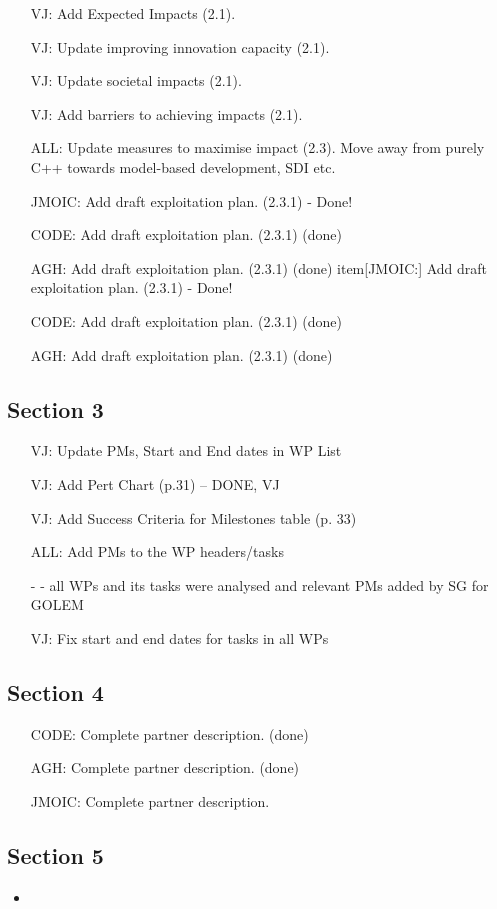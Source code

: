 \begin{itemize}
\item[VJ:]
Add Expected Impacts (2.1).
\item[VJ:]
Update improving innovation capacity (2.1).
\item[VJ:]
Update societal impacts (2.1).
\item[VJ:]
Add barriers to achieving impacts (2.1).
\item[ALL:]
Update measures to maximise impact (2.3).  Move away from purely C++ towards model-based development, SDI etc.
\item[JMOIC:]
Add draft exploitation plan. (2.3.1) - Done! 
\item[CODE:]
Add draft exploitation plan. (2.3.1)   (done)
\item[AGH:]
Add draft exploitation plan. (2.3.1) (done) 
item[JMOIC:]
Add draft exploitation plan. (2.3.1) - Done! 
\item[CODE:]
Add draft exploitation plan. (2.3.1)   (done)
\item[AGH:]
Add draft exploitation plan. (2.3.1) (done) 
\end{itemize}

\subsection*{Section 3}

\begin{itemize}
\item[VJ:]
Update PMs, Start and End dates in WP List
\item[VJ:]
Add Pert Chart (p.31) -- DONE, VJ
\item[VJ:]
Add Success Criteria for Milestones table (p. 33)
\item[ALL:]
Add PMs to the WP headers/tasks
\item[-] - all WPs and its tasks were analysed and relevant PMs added by SG for GOLEM 
\item[VJ:]
Fix start and end dates for tasks in all WPs
\end{itemize}

\subsection*{Section 4}

\begin{itemize}
\item[CODE:]
Complete partner description. (done)
\item[AGH:]
Complete partner description. (done)
\item[JMOIC:]
Complete partner description.
\end{itemize}

\subsection*{Section 5}

\begin{itemize}
\item
\end{itemize}

\newpage
